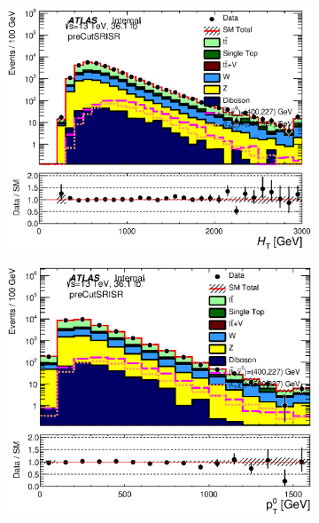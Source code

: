 \begin{figure}[h!]
\begin{center}
\begin{subfigure}[b]{0.40\textwidth}
                \caption{ }
    \end{subfigure}
    \begin{subfigure}[b]{0.40\textwidth}    
    	 \includegraphics[width=\textwidth]{figures/plotRegion/Ht_preCutSRISR_log.eps}
                \caption{ }
    \end{subfigure}
    \begin{subfigure}[b]{0.40\textwidth}    
    	 \includegraphics[width=\textwidth]{figures/plotRegion/JetPt_0__preCutSRISR_log.eps}
                \caption{ }
    \end{subfigure}
    \begin{subfigure}[b]{0.40\textwidth}    

\end{subfigure}
\end{center}
\end{figure}
